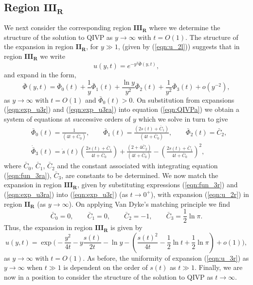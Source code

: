 \documentclass[11pt,a4paper]{article}
\newcommand{\eeref}[1]{(\ref{eqn:#1})}
\newcommand{\eelab}[1]{\label{eqn:#1}}
\newcommand{\sslab}[1]{\label{sec:#1}}
\def\beq{\begin{equation}}
\def\eeq{\end{equation}}
\begin{document}
\subsection{Region  $\mathbf{III_R}$}
 \sslab{large_spatialb}
We next consider the corresponding region $\mathbf{III_R}$ where we determine the structure of the solution to QIVP as $y \to \infty$ with $t=O(1)$. The structure of the expansion in region $\mathbf{II_R}$, for $y \gg 1$, (given by \eeref{u_2l}) suggests that in region $\mathbf{III_R}$ we write
\beq \eelab{exp_u3r}
u(y,t) = e^{-y^2 \bar{\Phi}(y,t)},
\eeq
and expand in the form, 
\beq \eelab{exp_u3ra}
\bar{\Phi}(y,t) = \bar{\Phi}_0(t) + \frac{1}{y} \bar{\Phi}_1(t) + \frac{ \ln y}{y^2} \bar{\Phi}_2(t) + \frac{1}{y^2} \bar{\Phi}_3(t) + o\left(y^{-2} \right),
\eeq
 as $y \to \infty$ with $t=O(1)$ and $\bar{\Phi}_0(t) > 0$. On substitution from expansions \eeref{exp_u3r} and \eeref{exp_u3ra} into equation \eeref{QIVPa} we obtain a system of equations at successive orders of $y$ which we solve in turn to give 
\begin{subequations}  \eelab{fun_3r}
 \begin{align}
& \bar{\Phi}_0(t)=\frac{1}{(4t+\bar{C}_0)}, \qquad \bar{\Phi}_1(t)=\frac{(2s(t) + \bar{C}_1)}{(4t + \bar{C}_0)}, \qquad \bar{\Phi}_2(t) = \bar{C}_2,  \\
& \dot{\bar{\Phi}}_3(t) = \dot{s}(t) \left( \frac{2s(t) + \bar{C}_1}{4t + \bar{C}_0} \right) + \frac{(2 + 4 \bar{C}_2)}{(4t + \bar{C}_0)} - \left( \frac{2s(t) + \bar{C}_1}{4t + \bar{C}_0} \right)^2, \eelab{fun_3ra}
\end{align} 
\end{subequations}
 where $\bar{C}_0$, $\bar{C}_1$, $\bar{C}_2$ and the constant associated with integrating equation \eeref{fun_3ra}, $\bar{C}_3$, are   constants to be determined. %
We now match the expansion in region $\mathbf{III_R}$, given by substituting expressions \eeref{fun_3r} and \eeref{exp_u3ra} into \eeref{exp_u3r} (as $t \to 0^+$), with expansion 
 \eeref{u_2r}
 in region $\mathbf{II_R}$ (as $y \to \infty$). On applying Van Dyke's matching principle \cite{VanDyke1975} we find
\beq
\bar{C}_0=0, \qquad \bar{C}_1=0, \qquad \bar{C}_2 = -1, \qquad \bar{C}_3 =\frac{1}{2} \ln \pi .
\eeq 
Thus, the expansion in region $\mathbf{III_R}$ is given by 
\beq \eelab{u_3r}
u(y,t) =  \exp \Bigg( -\frac{y^2}{4t}  - y \frac{ s(t)}{2t}   - \ln y -  \left( \frac{s(t)^2}{4t}  - \frac{1}{2} \ln t +  \frac{1}{2} \ln \pi  \right) +o(1) \Bigg),
\eeq
as $y \to  \infty$ with $t=O(1)$. As before, the uniformity of expansion \eeref{u_3r} as 
$y \to \infty $  when $t \gg 1$ is dependent on the order of $s(t)$ as $t \gg 1$.
Finally, we are now in a position to consider the structure of the solution to QIVP 
as $t\to\infty$. 
\end{document}

